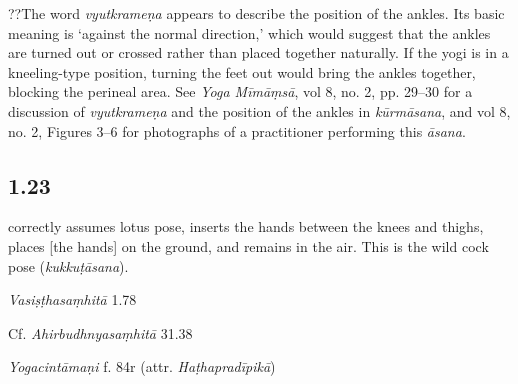 \begin{ekdosis}
\begin{philcomm}[hp01_022]
??The word \emph{vyutkrameṇa} appears to describe the position of the ankles. Its basic meaning is ‘against the normal direction,’ which would suggest that the ankles are turned out or crossed rather than placed together naturally. If the yogi is in a kneeling-type position, turning the feet out would bring the ankles together, blocking the perineal area. See \emph{Yoga Mīmāṃsā}, vol 8, no. 2, pp. 29–30 for a discussion of \emph{vyutkrameṇa} and the position of the ankles in \emph{kūrmāsana}, and vol 8, no. 2, Figures 3–6 for photographs of a practitioner performing this \emph{āsana}. 
\end{philcomm}

\subsection*{1.23}
\begin{translation} correctly assumes lotus pose, inserts the hands between the knees and thighs, places [the hands] on the ground, and remains in the air. This is the wild cock pose (\emph{kukkuṭāsana}).
\end{translation}

\begin{sources}[hp01_023]
\emph{Vasiṣṭhasaṃhitā} 1.78

\begin{versinnote}
\end{versinnote}

Cf. \emph{Ahirbudhnyasaṃhitā} 31.38

\begin{versinnote}
\end{versinnote}

\end{sources}

\begin{testimonia}[hp01_023]
\emph{Yogacintāmaṇi} f. 84r (attr. \emph{Haṭhapradīpikā})

\begin{versinnote}
\end{versinnote}


\end{testimonia}
\end{ekdosis}
